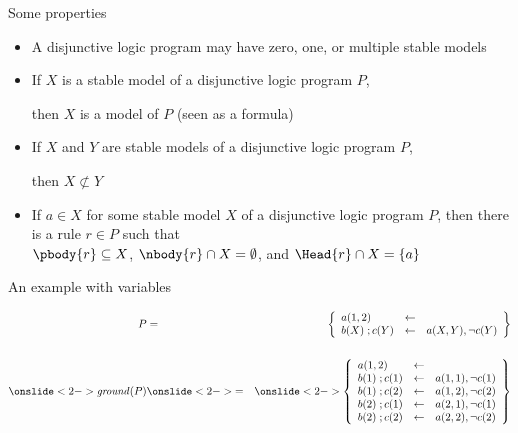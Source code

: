 \begin{frame}{Some properties}
\bigskip\bigskip
  \begin{itemize}
  \item A disjunctive logic program may have zero, one, or multiple stable models

  \item If $X$ is a  stable model of a disjunctive logic program $P$,

    then $X$ is a model of $P$ (seen as a formula)
  \item If $X$ and $Y$ are stable models of a disjunctive logic program $P$,

    then $X\not\subset Y$
    \bigskip
  \item<2> If $a\in X$ for some stable model $X$ of a disjunctive logic program $P$,
    then there is a rule
    $r\in P$
    such that\\
    $\pbody{r}\subseteq X$, $\nbody{r}\cap X=\emptyset$, and
    $\Head{r}\cap X=\{a\}$
  \end{itemize}
\end{frame}
\begin{frame}{An example with variables}

\begin{eqnarray*}
P
&=&
\left\{
  \begin{array}{lcl}
    a(1,2)&\leftarrow&
    \\
    b(X)\;;c(Y)&\leftarrow& a(X,Y), {\neg c(Y)}
  \end{array}
\right\}
\\
&&
\\
\onslide<2->{\mathit{ground}(P)}
&\onslide<2->{=}&
\onslide<2->{\left\{
  \begin{array}{lcl}
    a(1,2)&\leftarrow&
    \\
    b(1)\;;c(1)&\leftarrow& a(1,1), {\neg c(1)}
    \\
    b(1)\;;c(2)&\leftarrow& a(1,2), {\neg c(2)}
    \\
    b(2)\;;c(1)&\leftarrow& a(2,1), {\neg c(1)}
    \\
    b(2)\;;c(2)&\leftarrow& a(2,2), {\neg c(2)}
  \end{array}
\right\}}
\end{eqnarray*}

\end{frame}
